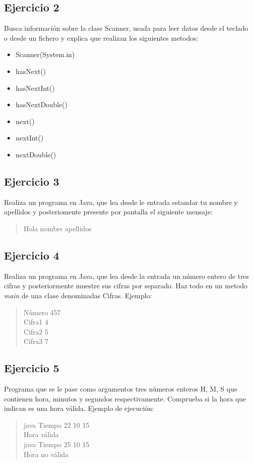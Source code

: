 \documentclass[4paper]{article}
\begin{document}
\subsection{Ejercicio 2}
Busca información sobre la clase Scanner, usada para leer datos desde el teclado o desde un fichero y explica que realizan los siguientes metodos:
\begin{itemize}
\item Scanner(System.in)
\item hasNext()
\item hasNextInt()
\item hasNextDouble()
\item next()
\item nextInt()
\item nextDouble()
\end{itemize}

\subsection{Ejercicio 3}
Realiza un programa en Java, que lea desde le entrada estandar tu nombre y apellidos y posteriomente presente por pantalla el siguiente mensaje: 
\begin{quote}
Hola nombre apellidos
\end{quote}




\subsection{Ejercicio 4}
Realiza un programa en Java, que lea desde la entrada un número entero de tres cifras y posteriormente muestre sus cifras por separado. Haz todo en un metodo \emph{main} de una clase denominadas Cifras. Ejemplo:
\begin{quote}
Número 457\\
Cifra1 4\\
Cifra2 5\\
Cifra3 7
\end{quote}

\subsection{Ejercicio 5}
Programa que se le pase como argumentos tres números enteros H, M, S que contienen hora, minutos y segundos respectivamente. Comprueba si la hora que indican es una hora válida. Ejemplo de ejecución:
\begin{quote}
java Tiempo 22 10 15\\
Hora válida\\
java Tiempo 25 10 15\\
Hora no válida\\
\end{quote}
\end{document}

